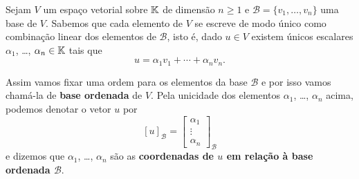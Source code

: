 Sejam $V$ um espaço vetorial sobre $\mathbb{K}$ de dimensão $n \ge 1$ e $\mathcal{B} = \{v_1,\dots,v_n\}$ uma base de $V$. Sabemos que cada elemento de $V$ se escreve de modo único como combinação linear dos elementos de $\mathcal{B}$, isto é, dado $u \in V$ existem únicos escalares $\alpha_1$, \dots, $\alpha_n \in \mathbb{K}$ tais que
\[
  u = \alpha_1v_1 + \cdots + \alpha_nv_n.
\]

Assim vamos fixar uma ordem para os elementos da base $\mathcal{B}$ e por isso vamos chamá-la de \textbf{base ordenada} de $V$. Pela unicidade dos elementos $\alpha_1$, \dots, $\alpha_n$ acima, podemos denotar o vetor $u$ por
\[
  [u]_\mathcal{B} = \begin{bmatrix}
    \alpha_1\\
    \vdots\\
    \alpha_n
  \end{bmatrix}_\mathcal{B}
\]
e dizemos que $\alpha_1$, \dots, $\alpha_n$ são as \textbf{coordenadas de $u$ em relação \`a base ordenada $\mathcal{B}$}.

